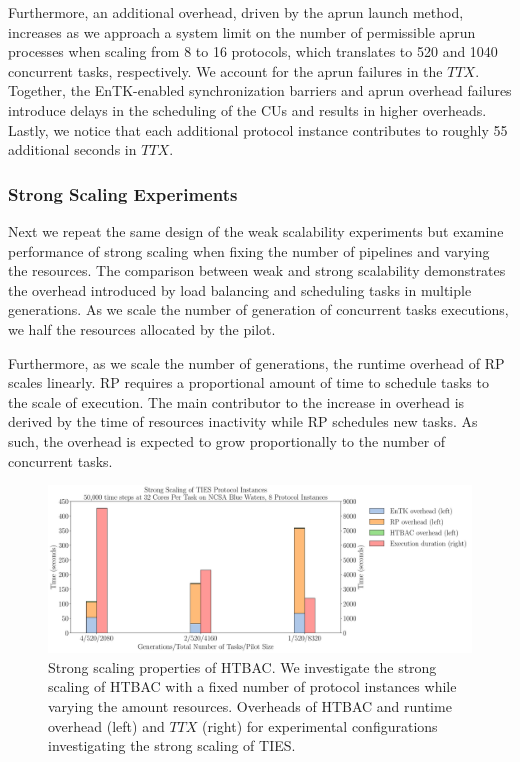 Furthermore, an additional overhead, driven by the aprun launch method,
increases as we approach a system limit on the number of permissible aprun
processes when scaling from 8 to 16 protocols, which translates to 520 and
1040 concurrent tasks, respectively. We account for the aprun failures in the
\(TTX\). Together, the EnTK-enabled synchronization barriers and aprun
overhead failures introduce delays in the scheduling of the CUs and results in
higher overheads. Lastly, we notice that each additional protocol instance
contributes to roughly 55 additional seconds in \(TTX\). 


\subsubsection {Strong Scaling Experiments}

Next we repeat the same design of the weak scalability experiments but examine
performance of strong scaling when fixing the number of pipelines and varying
the resources. The comparison between weak and strong scalability demonstrates
the overhead introduced by load balancing and scheduling tasks in multiple
generations. As we scale the number of generation of concurrent tasks 
executions, we half the resources allocated by the pilot. 

Furthermore, as we scale the number of generations, the runtime overhead of RP
scales linearly. RP requires a proportional amount of time to schedule tasks to
the scale of execution. The main contributor to the increase in overhead is 
derived by the time of resources inactivity while RP schedules new tasks.
As such, the overhead is expected to grow proportionally to the number of 
concurrent tasks.  


\begin{figure}
  \centering
   \includegraphics[width=\columnwidth]
   {figures/strong_scaling_TIES_instances_50,000_timesteps.pdf}
  \caption{Strong scaling properties of HTBAC. We investigate the
  strong scaling of HTBAC with a fixed number of protocol instances while
  varying the amount resources. Overheads of HTBAC and runtime overhead 
  (left) and \(TTX\) (right) for experimental configurations investigating the 
  strong scaling of TIES.}
\label{fig:strong_scaling}
\end{figure}

